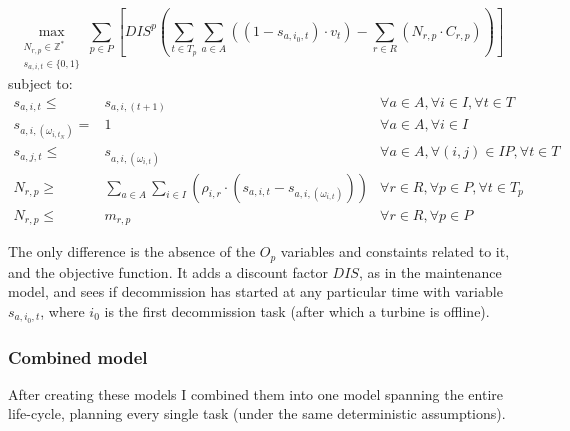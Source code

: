 \documentclass[a4paper,12pt]{article}
\begin{document}
\small
\begin{equation}
	\max_{\substack{N_{r,p} \in \mathbb{Z}^* \\
	s_{a,i,t} \in \{0, 1\}}} 
	\sum_{p \in P} [ DIS^p (\sum_{t\in T_p} \sum_{a \in A} ((1 - s_{a,i_0,t}) \cdot v_t)  - \sum_{r\in R} (N_{r,p} \cdot C_{r,p})) ]
\end{equation}
subject to:
\begin{align}		
s_{a,i,t} \leq& s_{a,i,(t+1)}											&	\forall a \in A, \forall i \in I, \forall t \in T				\\
s_{a,i,(\omega_{i,t_N})} =& 1											&	\forall a \in A, \forall i \in I						\\
s_{a,j,t} \leq& s_{a,i,(\omega_{i,t})}										&	\forall a \in A, \forall (i, j) \in IP, \forall t \in T 			\\
N_{r,p} \geq& \sum_{a \in A}\sum_{i\in I} (\rho_{i,r} \cdot (s_{a,i,t} - s_{a,i,(\omega_{i,t})}))	& 	\forall r \in R, \forall p \in P, \forall t \in T_p			\\
N_{r,p} \leq& m_{r,p}												& 	\forall r \in R, \forall p \in P
\end{align}
\normalsize

The only difference is the absence of the $O_p$ variables and constaints related to it, and the objective function. It adds a discount factor $DIS$, as in the maintenance model, and sees if decommission has started at any particular time with variable $s_{a,i_0,t}$, where $i_0$ is the first decommission task (after which a turbine is offline).

\subsubsection{Combined model} \label{sss:comb}

After creating these models I combined them into one model spanning the entire life-cycle, planning every single task (under the same deterministic assumptions).
\end{document}
